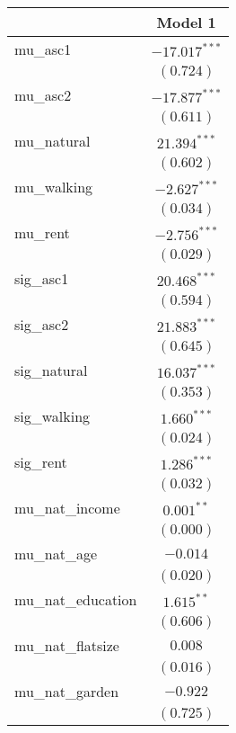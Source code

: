 
\begin{table}
\begin{center}
\begin{tabular}{l c}
\hline
 & Model 1 \\
\hline
mu\_asc1           & $-17.017^{***}$ \\
                   & $(0.724)$       \\
mu\_asc2           & $-17.877^{***}$ \\
                   & $(0.611)$       \\
mu\_natural        & $21.394^{***}$  \\
                   & $(0.602)$       \\
mu\_walking        & $-2.627^{***}$  \\
                   & $(0.034)$       \\
mu\_rent           & $-2.756^{***}$  \\
                   & $(0.029)$       \\
sig\_asc1          & $20.468^{***}$  \\
                   & $(0.594)$       \\
sig\_asc2          & $21.883^{***}$  \\
                   & $(0.645)$       \\
sig\_natural       & $16.037^{***}$  \\
                   & $(0.353)$       \\
sig\_walking       & $1.660^{***}$   \\
                   & $(0.024)$       \\
sig\_rent          & $1.286^{***}$   \\
                   & $(0.032)$       \\
mu\_nat\_income    & $0.001^{**}$    \\
                   & $(0.000)$       \\
mu\_nat\_age       & $-0.014$        \\
                   & $(0.020)$       \\
mu\_nat\_education & $1.615^{**}$    \\
                   & $(0.606)$       \\
mu\_nat\_flatsize  & $0.008$         \\
                   & $(0.016)$       \\
mu\_nat\_garden    & $-0.922$        \\
                   & $(0.725)$       \\

\end{tabular}
\end{center}
\end{table}
